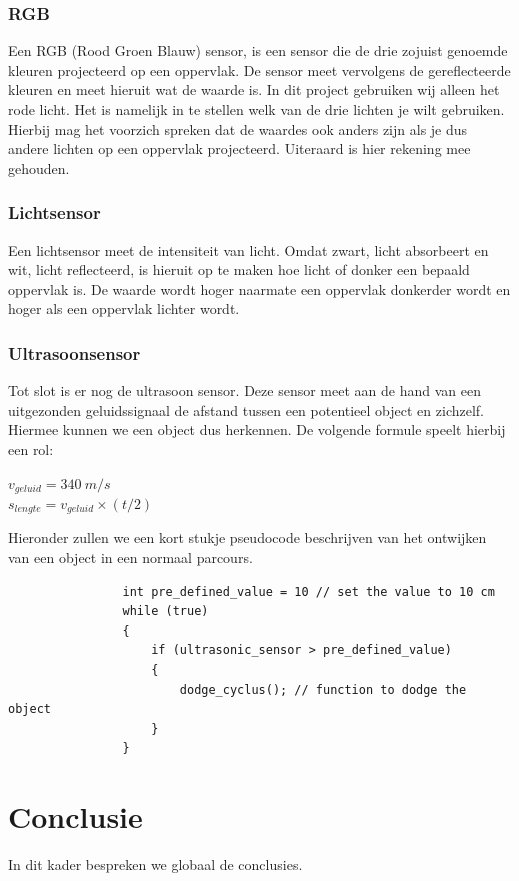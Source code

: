 \documentclass[12pt]{article}
\begin{document}
		\subsubsection{RGB}
			Een RGB (Rood Groen Blauw) sensor, is een sensor die de drie zojuist genoemde kleuren projecteerd op een oppervlak. De sensor meet vervolgens de gereflecteerde kleuren en meet hieruit wat de waarde is. In dit project gebruiken wij alleen het rode licht. Het is namelijk in te stellen welk van de drie lichten je wilt gebruiken. Hierbij mag het voorzich spreken dat de waardes ook anders zijn als je dus andere lichten op een oppervlak projecteerd. Uiteraard is hier rekening mee gehouden.
			
		\subsubsection{Lichtsensor}
			Een lichtsensor meet de intensiteit van licht. Omdat zwart, licht absorbeert en wit, licht reflecteerd, is hieruit op te maken hoe licht of donker een bepaald oppervlak is. De waarde wordt hoger naarmate een oppervlak donkerder wordt en hoger als een oppervlak lichter wordt.
			
		\subsubsection{Ultrasoonsensor}
			Tot slot is er nog de ultrasoon sensor. Deze sensor meet aan de hand van een uitgezonden geluidssignaal de afstand tussen een potentieel object en zichzelf. Hiermee kunnen we een object dus herkennen. De volgende formule speelt hierbij een rol:
			\begin{center}
				\Large $v_{geluid} = 340\ m/s$ \\
				\Large $s_{lengte} = v_{geluid} \times (t / 2)$ \\[0.5cm]
			\end{center}
			Hieronder zullen we een kort stukje pseudocode beschrijven van het ontwijken van een object in een normaal parcours.
			\begin{lstlisting}
				int pre_defined_value = 10 // set the value to 10 cm
				while (true)
				{
				    if (ultrasonic_sensor > pre_defined_value)
				    {
					    dodge_cyclus(); // function to dodge the object
				    }
				}
			\end{lstlisting}
\newpage
\section{Conclusie}
	In dit kader bespreken we globaal de conclusies.
\end{document}
